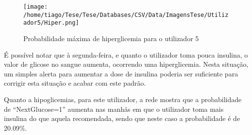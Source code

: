 \begin{figure}[H]
\centering
\texttt{[image: /home/tiago/Tese/Tese/Databases/CSV/Data/ImagensTese/Utilizador5/Hiper.png]}
\caption{Probabilidade máxima de hiperglicemia para o utilizador 5}
\label{fig:hiper5}
\end{figure}
É possível notar que à segunda-feira, e quanto o utilizador toma pouca insulina, o valor de glicose no sangue aumenta, ocorrendo uma hiperglicemia. Nesta situação, um simples alerta para aumentar a dose de insulina poderia ser suficiente para corrigir esta situação e acabar com este padrão.

Quanto a hipoglicemias, para este utilizador, a rede mostra que a probabilidade de ``Next\textunderscore Glucose=1'' aumenta nas manhãs em que o utilizador toma mais insulina do que aquela recomendada, sendo que neste caso a probabilidade é de 20.09\%.



